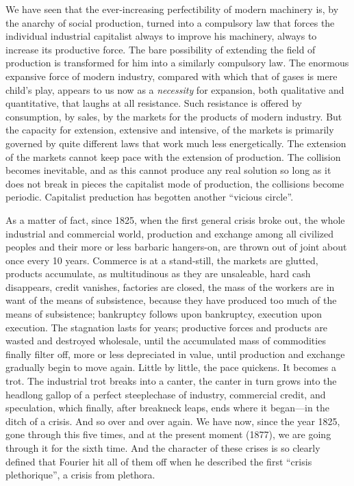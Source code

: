 We have seen that the ever-increasing perfectibility of modern machinery is, by
the anarchy of social production, turned into a compulsory law that forces the
individual industrial capitalist always to improve his machinery, always to
increase its productive force. The bare possibility of extending the field of
production is transformed for him into a similarly compulsory law. The enormous
expansive force of modern industry, compared with which that of gases is mere
child's play, appears to us now as a \emph{necessity} for expansion, both
qualitative and quantitative, that laughs at all resistance. Such resistance is
offered by consumption, by sales, by the markets for the products of modern
industry. But the capacity for extension, extensive and intensive, of the
markets is primarily governed by quite different laws that work much less
energetically. The extension of the markets cannot keep pace with the extension
of production. The collision becomes inevitable, and as this cannot produce any
real solution so long as it does not break in pieces the capitalist mode of
production, the collisions become periodic. Capitalist preduction has begotten
another ``vicious circle''.

As a matter of fact, since 1825, when the first general crisis broke out, the
whole industrial and commercial world, production and exchange among all
civilized peoples and their more or less barbaric hangers-on, are thrown out of
joint about once every 10 years. Commerce is at a stand-still, the markets are
glutted, products accumulate, as multitudinous as they are unsaleable, hard cash
disappears, credit vanishes, factories are closed, the mass of the workers are
in want of the means of subsistence, because they have produced too much of the
means of subsistence; bankruptcy follows upon bankruptcy, execution upon
execution. The stagnation lasts for years; productive forces and products are
wasted and destroyed wholesale, until the accumulated mass of commodities
finally filter off, more or less depreciated in value, until production and
exchange gradually begin to move again. Little by little, the pace quickens. It
becomes a trot. The industrial trot breaks into a canter, the canter in turn
grows into the headlong gallop of a perfect steeplechase of industry, commercial
credit, and speculation, which finally, after breakneck leaps, ends where it
began---in the ditch of a crisis. And so over and over again. We have now, since
the year 1825, gone through this five times, and at the present moment (1877),
we are going through it for the sixth time. And the character of these crises is
so clearly defined that Fourier hit all of them off when he described the first
``crisis plethorique'', a crisis from plethora.

